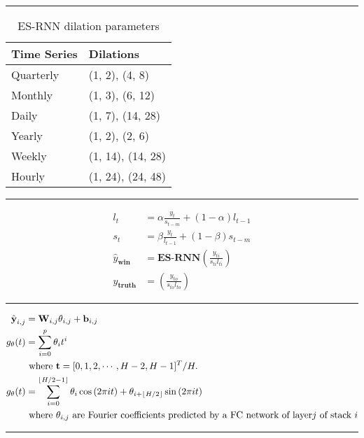 \documentclass{article}
\DeclarePairedDelimiter\floor{\lfloor}{\rfloor}
\begin{document}
\par\noindent\rule{\textwidth}{0.4pt}

\begin{table}[!ht]
	\centering
	\begin{tabular}{ll} \toprule
		\textbf{Time Series} & \textbf{Dilations} \\ 
		\midrule
		Quarterly  & (1, 2), (4, 8)	\\
		\midrule
		Monthly 	& (1, 3), (6, 12)	\\
		\midrule
		Daily 	& (1, 7), (14, 28)	\\
		\midrule		
		Yearly 	& (1, 2), (2, 6) 	\\
		\midrule		
		Weekly 	& (1, 14), (14, 28)	\\
		\midrule		
		Hourly 	& (1, 24), (24, 48)	\\
		\bottomrule
	\end{tabular}
	\caption*{ES-RNN dilation parameters}
\end{table}

\par\noindent\rule{\textwidth}{0.4pt}

\begin{align*}
	l_t 	&= \alpha \frac{y_t} {s_{t-m}} + (1-\alpha) l_{t-1} \\
	s_t 	&= \beta \frac{y_t}{l_{t-1}} + (1-\beta) s_{t-m} \\
	\hat{y}_{\textbf{win}}		&= \textbf{ES-RNN}(\frac{y_{ti}}{s_{ti} l_{ti}}) \\
	y_{\textbf{truth}}		&= (\frac{y_{to}}{s_{to} l_{to}}) 
\end{align*}

\par\noindent\rule{\textwidth}{0.4pt}

\begin{align*}
	\hat{\textbf{y}}_{i,j}	&= 	\textbf{W}_{i,j} \theta_{i,j}	+ \textbf{b}_{i,j} \\
		g_\theta (t)	&= 	\sum_{i=0}^p \theta_i t^i \\
					&	\text{ where } \textbf{t} = [0,1,2, \cdots, H-2, H-1]^T / H. \\
		g_\theta (t)	&= \sum_{i=0}^{\floor*{H/2-1}} \theta_i \cos{(2 \pi it)} + \theta_{i + \floor*{H/2}}  \sin{(2 \pi it)} \\
					&	\text{ where } \theta_{i,j} \text{ are Fourier coefficients predicted by a FC network of layer} j \text{ of stack } i
\end{align*}

\par\noindent\rule{\textwidth}{0.4pt}
\end{document}
